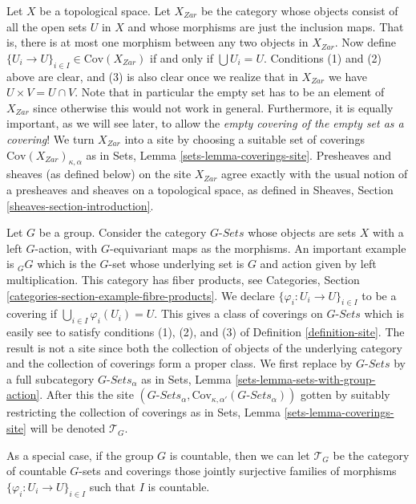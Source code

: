 \begin{example}
\label{example-site-topological}
Let $X$ be a topological space. Let $X_{Zar}$ be the category whose
objects consist of all the open sets $U$ in $X$ and whose morphisms
are just the inclusion maps. That is, there is at most one morphism
between any two objects in $X_{Zar}$. Now define
$\{U_i \to U\}_{i \in I}\in \text{Cov}(X_{Zar})$ if
and only if $\bigcup U_i = U$.
Conditions (1) and (2) above are clear, and (3) is also
clear once we realize that in $X_{Zar}$ we have
$U \times V = U \cap V$. Note that in particular the empty
set has to be an element of $X_{Zar}$ since otherwise
this would not work in general. Furthermore, it is equally important,
as we will see later, to allow the {\it empty covering of the empty
set as a covering}!
We turn $X_{Zar}$ into a site
by choosing a suitable set of coverings
$\text{Cov}(X_{Zar})_{\kappa, \alpha}$ as in
Sets, Lemma \ref{sets-lemma-coverings-site}.
Presheaves and sheaves (as defined below)
on the site $X_{Zar}$ agree exactly with the usual notion of
a presheaves and sheaves on a topological space, as defined
in Sheaves, Section \ref{sheaves-section-introduction}.
\end{example}

\begin{example}
\label{example-site-on-group}
Let $G$ be a group. Consider the category $G\textit{-Sets}$
whose objects are sets $X$ with a left $G$-action, with
$G$-equivariant maps as the morphisms. An important example
is ${}_GG$ which is the $G$-set whose underlying set is $G$ and
action given by left multiplication. This category has
fiber products, see Categories, Section
\ref{categories-section-example-fibre-products}.
We declare $\{\varphi_i : U_i \to U\}_{i\in I}$ to be
a covering if $\bigcup_{i\in I} \varphi_i(U_i) = U$.
This gives a class of coverings on $G\textit{-Sets}$
which is easily see to satisfy conditions (1), (2), and (3)
of Definition \ref{definition-site}. The result is not a
site since both the collection of objects of the underlying category and
the collection of coverings form a proper class.
We first replace by $G\textit{-Sets}$ by a
full subcategory $G\textit{-Sets}_\alpha$ as in Sets,
Lemma \ref{sets-lemma-sets-with-group-action}.
After this the site
$(G\textit{-Sets}_\alpha,
\text{Cov}_{\kappa, \alpha'}(G\textit{-Sets}_\alpha))$
gotten by suitably restricting the collection of coverings
as in Sets, Lemma \ref{sets-lemma-coverings-site} will be
denoted $\mathcal{T}_G$.

\medskip\noindent
As a special case, if the group $G$ is countable, then we can let
$\mathcal{T}_G$ be the category of countable $G$-sets and coverings
those jointly surjective families of morphisms
$\{\varphi_i : U_i \to U\}_{i \in I}$ such that $I$ is countable.
\end{example}

